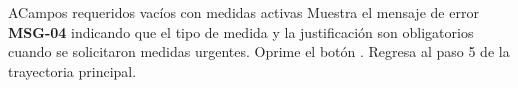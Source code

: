 \begin{UCtrayectoriaA}{A}{Campos requeridos vacíos con medidas activas}
	\UCpaso Muestra el mensaje de error \textbf{MSG-04} indicando que el tipo de medida y la justificación son obligatorios cuando se solicitaron medidas urgentes.
	\UCpaso[\UCactor] Oprime el botón .
	\UCpaso Regresa al paso 5 de la trayectoria principal.
\end{UCtrayectoriaA}

